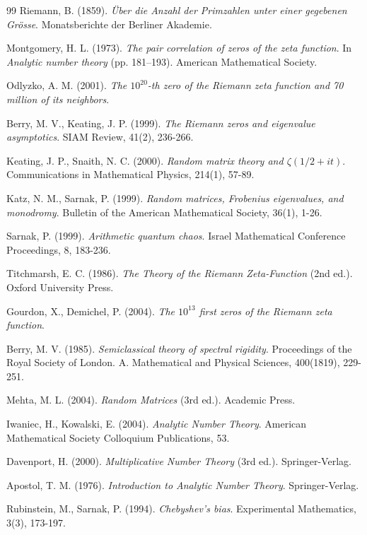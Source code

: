 \documentclass[12pt, a4paper]{article}
\theoremstyle{plain}
\theoremstyle{definition}
\theoremstyle{remark}
\begin{document}
\begin{thebibliography}{99}
Riemann, B. (1859). \textit{Über die Anzahl der Primzahlen unter einer gegebenen Grösse}. 
Monatsberichte der Berliner Akademie.

Montgomery, H. L. (1973). 
\textit{The pair correlation of zeros of the zeta function}. 
In \textit{Analytic number theory} (pp. 181--193). 
American Mathematical Society.

Odlyzko, A. M. (2001). 
\textit{The $10^{20}$-th zero of the Riemann zeta function and 70 million of its neighbors}.

Berry, M. V., Keating, J. P. (1999). 
\textit{The Riemann zeros and eigenvalue asymptotics}. 
SIAM Review, 41(2), 236-266.

Keating, J. P., Snaith, N. C. (2000). 
\textit{Random matrix theory and $\zeta(1/2+it)$}. 
Communications in Mathematical Physics, 214(1), 57-89.

Katz, N. M., Sarnak, P. (1999). 
\textit{Random matrices, Frobenius eigenvalues, and monodromy}. 
Bulletin of the American Mathematical Society, 36(1), 1-26.

Sarnak, P. (1999). 
\textit{Arithmetic quantum chaos}. 
Israel Mathematical Conference Proceedings, 8, 183-236.

Titchmarsh, E. C. (1986). 
\textit{The Theory of the Riemann Zeta-Function} (2nd ed.). 
Oxford University Press.

Gourdon, X., Demichel, P. (2004). 
\textit{The $10^{13}$ first zeros of the Riemann zeta function}.

Berry, M. V. (1985). 
\textit{Semiclassical theory of spectral rigidity}. 
Proceedings of the Royal Society of London. A. Mathematical and Physical Sciences, 400(1819), 229-251.

Mehta, M. L. (2004). 
\textit{Random Matrices} (3rd ed.). 
Academic Press.

Iwaniec, H., Kowalski, E. (2004). 
\textit{Analytic Number Theory}. 
American Mathematical Society Colloquium Publications, 53.

Davenport, H. (2000). 
\textit{Multiplicative Number Theory} (3rd ed.). 
Springer-Verlag.

Apostol, T. M. (1976). 
\textit{Introduction to Analytic Number Theory}. 
Springer-Verlag.

Rubinstein, M., Sarnak, P. (1994). 
\textit{Chebyshev's bias}. 
Experimental Mathematics, 3(3), 173-197.
\end{thebibliography}
\end{document}
